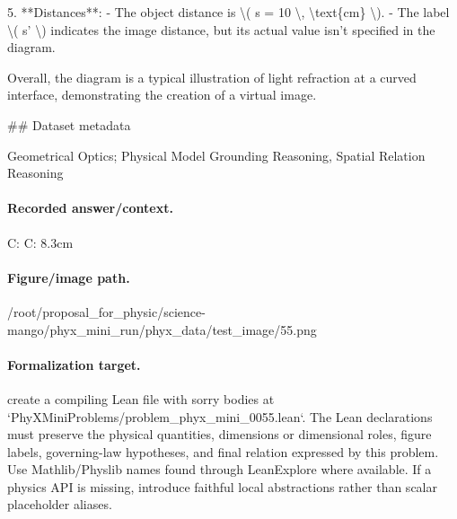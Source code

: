 5. **Distances**:
   - The object distance is \textbackslash{}( s = 10 \textbackslash{}, \textbackslash{}text\{cm\} \textbackslash{}).
   - The label \textbackslash{}( s' \textbackslash{}) indicates the image distance, but its actual value isn't specified in the diagram.

Overall, the diagram is a typical illustration of light refraction at a curved interface, demonstrating the creation of a virtual image.

\#\# Dataset metadata

Geometrical Optics; Physical Model Grounding Reasoning, Spatial Relation Reasoning

\paragraph{Recorded answer/context.}
C: C: 8.3cm

\paragraph{Figure/image path.}
/root/proposal\_for\_physic/science-mango/phyx\_mini\_run/phyx\_data/test\_image/55.png

\paragraph{Formalization target.}
create a compiling Lean file with sorry bodies at `PhyXMiniProblems/problem\_phyx\_mini\_0055.lean`. The Lean declarations must preserve the physical quantities, dimensions or dimensional roles, figure labels, governing-law hypotheses, and final relation expressed by this problem.
Use Mathlib/Physlib names found through LeanExplore where available. If a physics API is missing, introduce faithful local abstractions rather than scalar placeholder aliases.

